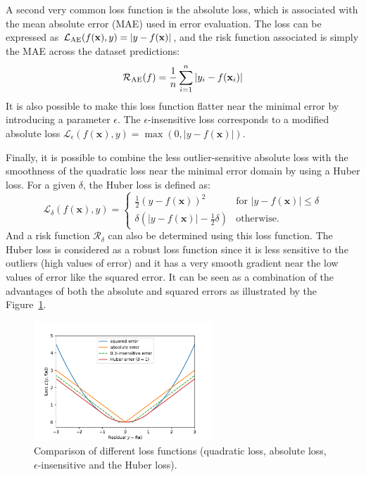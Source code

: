 \documentclass[main]{subfiles}
\begin{document}
A second very common loss function is the absolute loss, which is associated with the mean absolute error (MAE) used in error evaluation. The loss can be expressed as $\mathcal{L}_{\text{AE}}(f(\mathbf{x}),y)=\left|y-f(\mathbf{x})\right|$, and the risk function associated is simply the MAE across the dataset predictions:
\begin{equation}
  \mathcal{R}_{\text{AE}}(f) = \frac{1}{n}\sum_{i=1}^n \left|y_i-f(\mathbf{x}_i)\right|
\end{equation}
It is also possible to make this loss function flatter near the minimal error by introducing a parameter $\epsilon$. The $\epsilon$-insensitive loss corresponds to a modified absolute loss $\mathcal{L}_{\epsilon}(f(\mathbf{x}),y)=\max\left(0,\left|y-f(\mathbf{x})\right|\right)$.

Finally, it is possible to combine the less outlier-sensitive absolute loss with the smoothness of the quadratic loss near the minimal error domain by using a Huber loss. For a given $\delta$, the Huber loss is defined as:
\begin{equation}
  \mathcal{L}_{\delta}(f(\mathbf{x}),y) = \left\{
    \begin{array}{ll}
        \tfrac{1}{2}{\left(y-f(\mathbf{x})\right)}^2 & \mbox{for } \left|y-f(\mathbf{x})\right| \leq \delta \\
        \delta\left(\left|y-f(\mathbf{x})\right| - \tfrac{1}{2}\delta\right) & \mbox{otherwise.}
    \end{array}
  \right.
\end{equation}
And a risk function $\mathcal{R}_{\delta}$ can also be determined using this loss function. The Huber loss is considered as a robust loss function since it is less sensitive to the outliers (high values of error) and it has a very smooth gradient near the low values of error like the squared error. It can be seen as a combination of the advantages of both the absolute and squared errors as illustrated by the Figure~\ref{fgr:loss_comp}.

\begin{figure}[ht]
  \centering
    \includegraphics[width=0.6\textwidth]{figures/4-ml/loss_comparison.pdf}
    \caption{Comparison of different loss functions (quadratic loss, absolute loss, $\epsilon$-insensitive and the Huber loss). }\label{fgr:loss_comp}
\end{figure}
\end{document}
